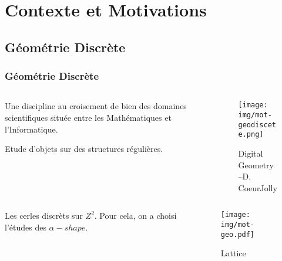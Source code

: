 \documentclass{beamer}
\begin{document}
\section{Contexte et Motivations} 

\subsection{Géométrie Discrète} 
\begin{frame}
  \frametitle{Géométrie Discrète}

  \begin{columns}[t]
    \begin{column}{6cm}
      \begin{block}{}
        Une discipline au croisement de bien des domaines scientifiques située entre les Mathématiques et l'Informatique.
      \end{block}
      \begin{center}  
        \alert{Etude d'objets sur des structures régulières.} 
      \end{center}
    \end{column}

    \begin{column}{4cm}
      \begin{figure}[h!]
      \centering
         \texttt{[image: img/mot-geodiscete.png]}
      \caption{Digital Geometry --D. CoeurJolly}
      \end{figure}

    \end{column}
  \end{columns}  

  \begin{columns}[t]
    \begin{column}{6cm}
      \begin{block}{}
        Les \alert{cerles discrèts} sur $Z^2$. Pour cela, on a choisi l'études des \alert{$\alpha-shape$}.
      \end{block}
    \end{column}
    \begin{column}{4cm}

      \begin{figure}[h!]
      \centering
        \texttt{[image: img/mot-geo.pdf]}
        \caption{Lattice}
      \end{figure}
    \end{column}
  \end{columns}  

\end{frame}
\end{document}
